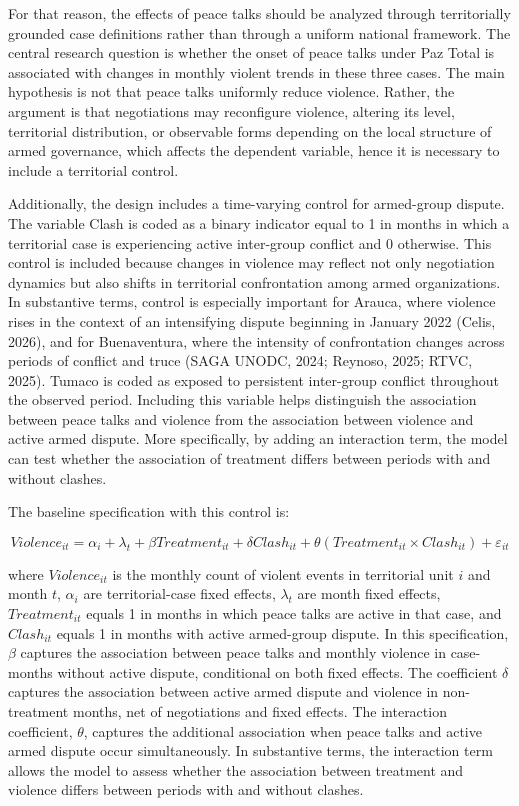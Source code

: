 \documentclass[11pt]{article}
\begin{document}
For that reason, the effects of peace talks should be analyzed through territorially grounded case definitions rather than through a uniform national framework. The central research question is whether the onset of peace talks under Paz Total is associated with changes in monthly violent trends in these three cases. The main hypothesis is not that peace talks uniformly reduce violence. Rather, the argument is that negotiations may reconfigure violence, altering its level, territorial distribution, or observable forms depending on the local structure of armed governance, which affects the dependent variable, hence it is necessary to include a territorial control.

Additionally, the design includes a time-varying control for armed-group dispute. The variable Clash is coded as a binary indicator equal to 1 in months in which a territorial case is experiencing active inter-group conflict and 0 otherwise. This control is included because changes in violence may reflect not only negotiation dynamics but also shifts in territorial confrontation among armed organizations. In substantive terms, control is especially important for Arauca, where violence rises in the context of an intensifying dispute beginning in January 2022 (Celis, 2026), and for Buenaventura, where the intensity of confrontation changes across periods of conflict and truce (SAGA UNODC, 2024; Reynoso, 2025; RTVC, 2025). Tumaco is coded as exposed to persistent inter-group conflict throughout the observed period. Including this variable helps distinguish the association between peace talks and violence from the association between violence and active armed dispute. More specifically, by adding an interaction term, the model can test whether the association of treatment differs between periods with and without clashes.

The baseline specification with this control is:

\[
Violence_{it} = \alpha_i + \lambda_t + \beta Treatment_{it} + \delta Clash_{it} + \theta \left(Treatment_{it} \times Clash_{it}\right) + \varepsilon_{it}
\]

where \(Violence_{it}\) is the monthly count of violent events in territorial unit \(i\) and month \(t\), \(\alpha_i\) are territorial-case fixed effects, \(\lambda_t\) are month fixed effects, \(Treatment_{it}\) equals 1 in months in which peace talks are active in that case, and \(Clash_{it}\) equals 1 in months with active armed-group dispute. In this specification, \(\beta\) captures the association between peace talks and monthly violence in case-months without active dispute, conditional on both fixed effects. The coefficient \(\delta\) captures the association between active armed dispute and violence in non-treatment months, net of negotiations and fixed effects. The interaction coefficient, \(\theta\), captures the additional association when peace talks and active armed dispute occur simultaneously. In substantive terms, the interaction term allows the model to assess whether the association between treatment and violence differs between periods with and without clashes.
\end{document}
